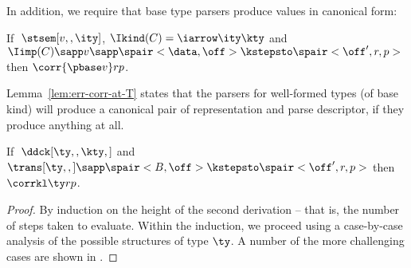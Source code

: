 In addition, we require that base type parsers produce values in canonical form:
\begin{condition}
  \label{cond:base-types-cf}
  If $\;\stsem[v,,\ity]$, $\Ikind(C) = \iarrow \ity \kty$ and $\Iimp(C)
  \sapp v \sapp \spair<\data,\off> \kstepsto \spair<\off',r,p>$ then
  $\corr {\pbase v} r p $.
\end{condition}

Lemma~\ref{lem:err-corr-at-T} states that the parsers for
well-formed types (of base kind) will produce a canonical pair of
representation and parse descriptor, if they produce anything at all.

\begin{lemma}
\label{lem:err-corr-at-T}
If $\; \ddck[\ty,,\kty,]$ and $\trans[\ty,,] \sapp \spair<B,\off> \kstepsto
  \spair<\off',r,p>$ then $\corrkl \ty r p$.
\end{lemma}

\begin{proof}
  By induction on the height of the second derivation -- that is, the
  number of steps taken to evaluate. Within the induction, we proceed
  using a case-by-case analysis of the possible structures of type
  $\ty$.  A number of the more challenging cases are shown in
  .
\end{proof}



